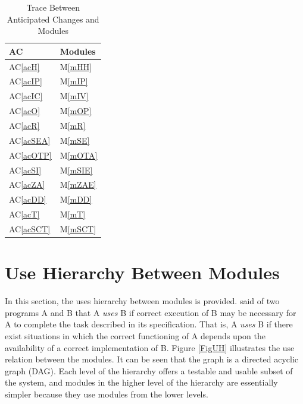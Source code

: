 \documentclass[12pt, titlepage]{article}
\newcommand{\acref}[1]{AC\ref{#1}}
\newcommand{\mref}[1]{M\ref{#1}}
\begin{document}
\begin{table}[H]
\centering
\begin{tabular}{p{} p{}}
\toprule
\textbf{AC} & \textbf{Modules}\\
\midrule
\acref{acH} & \mref{mHH}\\
\acref{acIP} & \mref{mIP}\\
\acref{acIC} & \mref{mIV}\\
\acref{acO} & \mref{mOP}\\
\acref{acR} & \mref{mR}\\
\acref{acSEA} & \mref{mSE}\\
\acref{acOTP} & \mref{mOTA}\\
\acref{acSI} & \mref{mSIE}\\
\acref{acZA} & \mref{mZAE}\\
\acref{acDD} & \mref{mDD}\\
\acref{acT} & \mref{mT}\\
\acref{acSCT} & \mref{mSCT}\\
\bottomrule
\end{tabular}
\caption{Trace Between Anticipated Changes and Modules}
\label{TblACT}
\end{table}

\section{Use Hierarchy Between Modules} \label{SecUse}

In this section, the uses hierarchy between modules is
provided. \citet{Parnas1978} said of two programs A and B that A {\em uses} B
if correct execution of B may be necessary for A to complete the task described
in
its specification. That is, A {\em uses} B if there exist situations in which
the correct functioning of A depends upon the availability of a correct
implementation of B.  Figure \ref{FigUH} illustrates the use relation between
the modules. It can be seen that the graph is a directed acyclic graph
(DAG). Each level of the hierarchy offers a testable and usable subset of the
system, and modules in the higher level of the hierarchy are essentially
simpler because they use modules from the lower levels.
\end{document}

